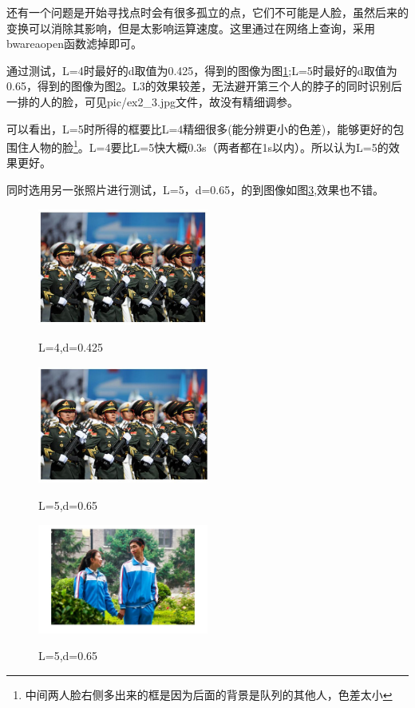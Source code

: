 \documentclass{ctexart}
\begin{document}
还有一个问题是开始寻找点时会有很多孤立的点，它们不可能是人脸，虽然后来的变换可以消除其影响，但是太影响运算速度。这里通过在网络上查询，采用bwareaopen函数滤掉即可。

通过测试，L=4时最好的d取值为0.425，得到的图像为图\ref{a342a};L=5时最好的d取值为0.65，得到的图像为图\ref{a342b}。L3的效果较差，无法避开第三个人的脖子的同时识别后一排的人的脸，可见pic/ex2\_3.jpg文件，故没有精细调参。

可以看出，L=5时所得的框要比L=4精细很多(能分辨更小的色差)，能够更好的包围住人物的脸\footnote{中间两人脸右侧多出来的框是因为后面的背景是队列的其他人，色差太小}。L=4要比L=5快大概0.3s（两者都在1s以内）。所以认为L=5的效果更好。

同时选用另一张照片进行测试，L=5，d=0.65，的到图像如图\ref{a342c},效果也不错。
\begin{figure}
    \centering
    \includegraphics[width=0.5\textwidth]{pic/ex2_4_0.425.jpg}\\
    \caption{L=4,d=0.425\label{a342a}}
\end{figure}

\begin{figure}
    \centering
    \includegraphics[width=0.5\textwidth]{pic/ex2_5_0.65.jpg}\\
    \caption{L=5,d=0.65\label{a342b}}
\end{figure}

\begin{figure}
    \centering
    \includegraphics[width=0.5\textwidth]{pic/ex1.jpg}\\
    \caption{L=5,d=0.65\label{a342c}}
\end{figure}
\end{document}
